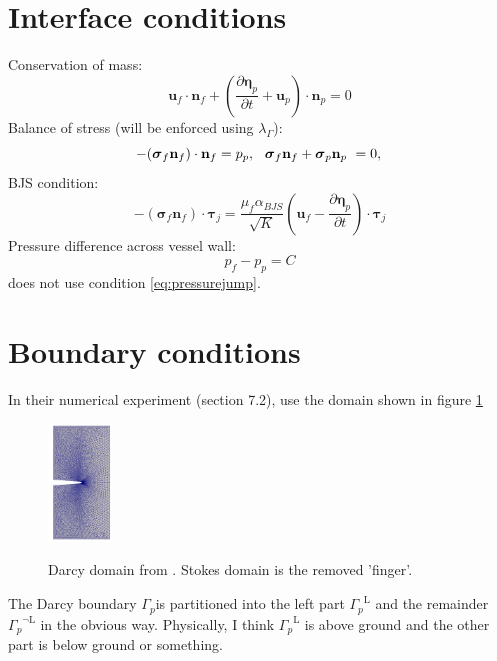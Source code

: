 \documentclass{article}
\newcommand{\sigmabf}{\ensuremath{\boldsymbol{\sigma}}}
\newcommand{\taubf}{\ensuremath{\boldsymbol{\tau}}}
\newcommand{\ddt}[1]{\ensuremath{\frac {\partial #1} {\partial t}}}
\newcommand{\darcybdy}{\ensuremath{\Gamma_{p}}}
\newcommand{\nf}{\ensuremath{\mathbf{n}_f}}
\newcommand{\np}{\ensuremath{\mathbf{n}_p}}
\newcommand{\uf}{\ensuremath{\mathbf{u}_f}}
\newcommand{\up}{\ensuremath{\mathbf{u}_p}}
\newcommand{\pf}{\ensuremath{p_f}}
\newcommand{\pp}{\ensuremath{p_p}}
\newcommand{\disp}{\ensuremath{\boldsymbol{\eta}_p}}
\newcommand{\mult}{\ensuremath{\lambda_{\Gamma}}}
\begin{document}
\section{Interface conditions}

Conservation of mass:
\begin{equation}
\uf  \cdot \nf + \left ( \ddt{\disp} + \up \right ) \cdot \np = 0  \label{eq:massconservation}
\end{equation}
Balance of stress (will be enforced using \mult):
\begin{equation}
  -(\sigmabf_f \nf) \cdot \nf = \pp, \hspace{0.02\linewidth} \sigmabf_f \nf + \sigmabf_p \np \ = 0, \:  \label{eq:stressbalance}
\end{equation}
BJS condition:
\begin{equation}
  -(\sigmabf_f \nf) \cdot \taubf_j = \frac {\mu_f \alpha_{BJS}} {\sqrt{K}} \left ( \uf - \ddt{\disp} \right ) \cdot \taubf_j
  \label{eq:BJS}
\end{equation}
Pressure difference across vessel wall:
\begin{equation}
  \pf - \pp = C
  \label{eq:pressurejump}
\end{equation}
\cite{ambartsumyan} does not use condition \ref{eq:pressurejump}.



\section{Boundary conditions}
In their numerical experiment (section 7.2), \cite{ambartsumyan} use the domain shown in figure \ref{fig:ambartsumyandomain}
\begin{figure}[h]
  \centering
  \includegraphics[width=0.15\textwidth]{img/ambartsumyandomain.png}
  \label{fig:ambartsumyandomain}
  \caption{Darcy domain from \cite{ambartsumyan}. Stokes domain is the removed 'finger'.}
\end{figure}
The Darcy boundary \darcybdy is partitioned into the left part $\darcybdy^{\text{L}}$ and the remainder $\darcybdy^{\neg \text{L}}$ in the obvious way. Physically, I think $\darcybdy^{\text{L}}$ is above ground and the other part is below ground or something.
\end{document}

